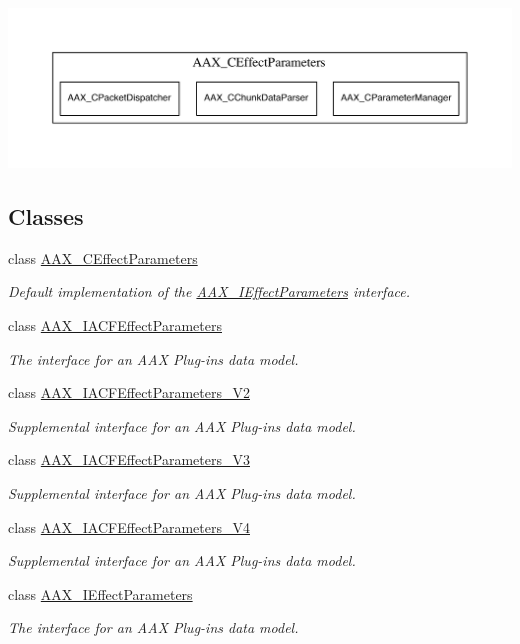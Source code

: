 \begin{DoxyImage}
\includegraphics[width=\textwidth,height=\textheight/2,keepaspectratio=true]{dot_aax_ieffectparams_contained}
\caption{Classes owned as member objects of A\+A\+X\+\_\+\+C\+Effect\+Parameters}
\end{DoxyImage}
\subsection*{Classes}
\begin{DoxyCompactItemize}
\item 
class \hyperlink{a00018}{A\+A\+X\+\_\+\+C\+Effect\+Parameters}
\begin{DoxyCompactList}\small\item\em Default implementation of the \hyperlink{a00099}{A\+A\+X\+\_\+\+I\+Effect\+Parameters} interface. \end{DoxyCompactList}\item 
class \hyperlink{a00061}{A\+A\+X\+\_\+\+I\+A\+C\+F\+Effect\+Parameters}
\begin{DoxyCompactList}\small\item\em The interface for an A\+A\+X Plug-\/in\textquotesingle{}s data model. \end{DoxyCompactList}\item 
class \hyperlink{a00062}{A\+A\+X\+\_\+\+I\+A\+C\+F\+Effect\+Parameters\+\_\+\+V2}
\begin{DoxyCompactList}\small\item\em Supplemental interface for an A\+A\+X Plug-\/in\textquotesingle{}s data model. \end{DoxyCompactList}\item 
class \hyperlink{a00063}{A\+A\+X\+\_\+\+I\+A\+C\+F\+Effect\+Parameters\+\_\+\+V3}
\begin{DoxyCompactList}\small\item\em Supplemental interface for an A\+A\+X Plug-\/in\textquotesingle{}s data model. \end{DoxyCompactList}\item 
class \hyperlink{a00064}{A\+A\+X\+\_\+\+I\+A\+C\+F\+Effect\+Parameters\+\_\+\+V4}
\begin{DoxyCompactList}\small\item\em Supplemental interface for an A\+A\+X Plug-\/in\textquotesingle{}s data model. \end{DoxyCompactList}\item 
class \hyperlink{a00099}{A\+A\+X\+\_\+\+I\+Effect\+Parameters}
\begin{DoxyCompactList}\small\item\em The interface for an A\+A\+X Plug-\/in\textquotesingle{}s data model. \end{DoxyCompactList}\end{DoxyCompactItemize}
